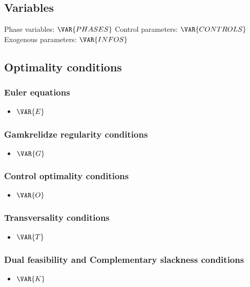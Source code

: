 \documentclass{article}
\begin{document}
\subsection{Variables}

Phase variables: $\VAR{PHASES}$
\newline
Control parameters: $\VAR{CONTROLS}$
\newline
Exogenous parameters: $\VAR{INFOS}$

\subsection{Optimality conditions}
\subsubsection{Euler equations}
\begin{itemize}
    \item $\VAR{E}$
\end{itemize}

\subsubsection{Gamkrelidze regularity conditions}
\begin{itemize}
    \item $\VAR{G}$
\end{itemize}

\subsubsection{Control optimality conditions}
\begin{itemize}
    \item $\VAR{O}$
\end{itemize}

\subsubsection{Transversality conditions}
\begin{itemize}
    \item $\VAR{T}$
\end{itemize}

\subsubsection{Dual feasibility and Complementary slackness conditions}
\begin{itemize}
    \item $\VAR{K}$
\end{itemize}
\end{document}

